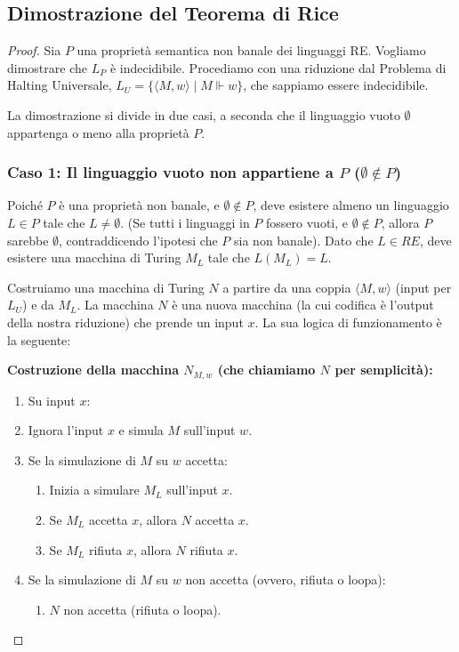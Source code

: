 \documentclass[a4paper]{article}
\theoremstyle{definition} %
\begin{document}
\subsection{Dimostrazione del Teorema di Rice}
\begin{proof}
Sia $P$ una proprietà semantica non banale dei linguaggi RE. Vogliamo dimostrare che $L_P$ è indecidibile. Procediamo con una riduzione dal Problema di Halting Universale, $L_U = \{\langle M,w \rangle \mid M \Vdash w\}$, che sappiamo essere indecidibile.

La dimostrazione si divide in due casi, a seconda che il linguaggio vuoto $\emptyset$ appartenga o meno alla proprietà $P$.

\subsubsection{Caso 1: Il linguaggio vuoto non appartiene a $P$ ($\emptyset \notin P$)}
Poiché $P$ è una proprietà non banale, e $\emptyset \notin P$, deve esistere almeno un linguaggio $L \in P$ tale che $L \neq \emptyset$. (Se tutti i linguaggi in $P$ fossero vuoti, e $\emptyset \notin P$, allora $P$ sarebbe $\emptyset$, contraddicendo l'ipotesi che $P$ sia non banale).
Dato che $L \in RE$, deve esistere una macchina di Turing $M_L$ tale che $L(M_L) = L$.

Costruiamo una macchina di Turing $N$ a partire da una coppia $\langle M,w \rangle$ (input per $L_U$) e da $M_L$. La macchina $N$ è una nuova macchina (la cui codifica è l'output della nostra riduzione) che prende un input $x$. La sua logica di funzionamento è la seguente:

\textbf{Costruzione della macchina $N_{M,w}$ (che chiamiamo $N$ per semplicità):}
\begin{enumerate}
    \item Su input $x$:
    \item Ignora l'input $x$ e simula $M$ sull'input $w$.
    \item Se la simulazione di $M$ su $w$ accetta:
        \begin{enumerate}
            \item Inizia a simulare $M_L$ sull'input $x$.
            \item Se $M_L$ accetta $x$, allora $N$ accetta $x$.
            \item Se $M_L$ rifiuta $x$, allora $N$ rifiuta $x$.
        \end{enumerate}
    \item Se la simulazione di $M$ su $w$ non accetta (ovvero, rifiuta o loopa):
        \begin{enumerate}
            \item $N$ non accetta (rifiuta o loopa).
        \end{enumerate}
\end{enumerate}


\end{proof}
\end{document}
